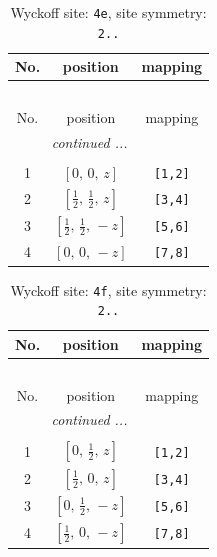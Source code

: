 \documentclass[fleqn,8pt]{jsarticle}
\begin{document}
\begin{longtable}{ccc}
\caption{Wyckoff site: {\tt 4e}, site symmetry: {\tt 2..}}
 \\
 \hline \hline
No. & position & mapping \\ \hline \endfirsthead

\multicolumn{2}{l}{\tablename\ \thetable{}} \\
 \hline \hline
No. & position & mapping \\ \hline \endhead

 \hline \hline
\multicolumn{2}{r}{\footnotesize\it continued ...} \\ \endfoot

 \hline \hline
\multicolumn{2}{r}{} \\ \endlastfoot

1 & $\left[ 0,\, 0,\, z \right]$ & {\tt [1,2]} \\ \hline
2 & $\left[ \frac{1}{2},\, \frac{1}{2},\, z \right]$ & {\tt [3,4]} \\ \hline
3 & $\left[ \frac{1}{2},\, \frac{1}{2},\, - z \right]$ & {\tt [5,6]} \\ \hline
4 & $\left[ 0,\, 0,\, - z \right]$ & {\tt [7,8]} \\
\end{longtable}
\renewcommand{\arraystretch}{1.2}
\begin{longtable}{ccc}
\caption{Wyckoff site: {\tt 4f}, site symmetry: {\tt 2..}}
 \\
 \hline \hline
No. & position & mapping \\ \hline \endfirsthead

\multicolumn{2}{l}{\tablename\ \thetable{}} \\
 \hline \hline
No. & position & mapping \\ \hline \endhead

 \hline \hline
\multicolumn{2}{r}{\footnotesize\it continued ...} \\ \endfoot

 \hline \hline
\multicolumn{2}{r}{} \\ \endlastfoot

1 & $\left[ 0,\, \frac{1}{2},\, z \right]$ & {\tt [1,2]} \\ \hline
2 & $\left[ \frac{1}{2},\, 0,\, z \right]$ & {\tt [3,4]} \\ \hline
3 & $\left[ 0,\, \frac{1}{2},\, - z \right]$ & {\tt [5,6]} \\ \hline
4 & $\left[ \frac{1}{2},\, 0,\, - z \right]$ & {\tt [7,8]} \\
\end{longtable}
\end{document}
